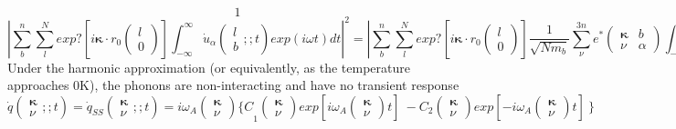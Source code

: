 \[1\] 
\[{\left|\sum\limits^n_b{\sum\limits^N_l{exp?[i{\mathbf \kappa }\cdot r_0\left( \begin{array}{c}
l \\ 
0 \end{array}
\right)]\int\nolimits^{\infty }_{-\infty }{{\dot{u}}_{\alpha }\left( \begin{array}{c}
l \\ 
b \end{array}
;;t\right)exp(i\omega t)dt}}}\right|}^2={\left|\sum\limits^n_b{\sum\limits^N_l{exp?[i{\mathbf \kappa }\cdot r_0\left( \begin{array}{c}
l \\ 
0 \end{array}
\right)]\frac{1}{\sqrt{Nm_b}}\sum\limits^{3n}_{\nu }{e^*\left( \begin{array}{cc}
{\mathbf \kappa } & b \\ 
\nu  & \alpha  \end{array}
\right)\int\nolimits^{\infty }_{-\infty }{\dot{q}\left( \begin{array}{c}
{\mathbf \kappa } \\ 
\nu  \end{array}
;;t\right)exp(i\omega t)dt}}}}\right|}^2\] 
Under the harmonic approximation (or equivalently, as the temperature approaches 0K), the phonons are non-interacting and have no transient response
\[\dot{q}\left( \begin{array}{c}
{\mathbf \kappa } \\ 
\nu  \end{array}
;;t\right)={\dot{q}}_{SS}\left( \begin{array}{c}
{\mathbf \kappa } \\ 
\nu  \end{array}
;;t\right)={i{\omega }_A\left( \begin{array}{c}
{\mathbf \kappa } \\ 
\nu  \end{array}
\right)\{C}_1\left( \begin{array}{c}
{\mathbf \kappa } \\ 
\nu  \end{array}
\right){exp \left[i{\omega }_A\left( \begin{array}{c}
{\mathbf \kappa } \\ 
\nu  \end{array}
\right)t\right]\ }-C_2\left( \begin{array}{c}
{\mathbf \kappa } \\ 
\nu  \end{array}
\right){exp \left[-i{\omega }_A\left( \begin{array}{c}
{\mathbf \kappa } \\ 
\nu  \end{array}
\right)t\right]\ }\}\] 
